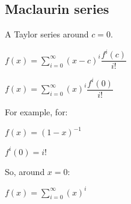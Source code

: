 
\subsection{Maclaurin series}

A Taylor series around \(c=0\).

\(f(x)=\sum_{i=0}^\infty (x-c)^i \dfrac{f^i(c)}{i!}\)

\(f(x)=\sum_{i=0}^\infty (x)^i \dfrac{f^i(0)}{i!}\)

For example, for:	   

\(f(x)=(1-x)^{-1}\)

\(f^i(0)=i!\)

So, around \(x=0\):

\(f(x)=\sum_{i=0}^\infty (x)^i\)

